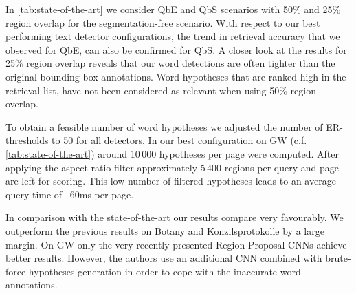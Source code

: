 In \autoref{tab:state-of-the-art} we consider QbE and QbS scenarios with 50\% and 25\% region overlap for 
the segmentation-free scenario. With respect to our best performing text detector configurations, the 
trend in retrieval accuracy that we observed for QbE, can also be confirmed for QbS. 
A closer look at the results for 25\% region overlap reveals that our word detections are often tighter than 
the original bounding box annotations. Word hypotheses 
that are ranked high in the retrieval list, have not been considered as relevant when using
50\% region overlap.

To obtain a feasible number of word hypotheses we adjusted the number of ER-thresholds to 50 for all detectors.
In our best configuration %
on GW (c.f. \autoref{tab:state-of-the-art}) around 10\,000 hypotheses per page were computed. 
After applying the aspect ratio filter approximately 5\,400 regions per query and page are left for scoring.
This low number of filtered hypotheses leads to an average query time of ~60ms per page. 

In comparison with the state-of-the-art our results compare very favourably. We outperform the previous 
results on Botany and Konzilsprotokolle by a large margin. On GW only the very recently presented 
Region Proposal CNNs \cite{Wilkinson17} achieve better results. However, the authors use an additional CNN 
combined with brute-force hypotheses generation in order to cope with the inaccurate word annotations. 



